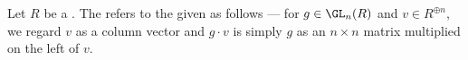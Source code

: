 \begin{definition} \label{definition:standard_action_of_GL_n_R_on_R_n}
    Let $R$ be a . 
    The  refers to the  given as follows --- for $g \in \GL_n(R)$ and $v \in R^{\oplus n}$, we regard $v$ as a column vector and $g \cdot v$ is simply $g$ as an $n \times n$ matrix multiplied on the left of $v$. 
\end{definition}